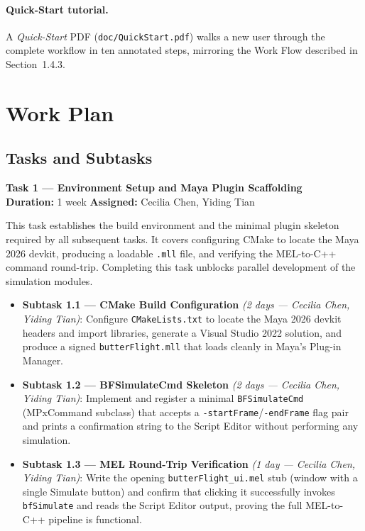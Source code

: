 \documentclass[12pt]{article}
\begin{document}
\paragraph{Quick-Start tutorial.}
A \textit{Quick-Start} PDF (\texttt{doc/QuickStart.pdf}) walks a new user through
the complete workflow in ten annotated steps, mirroring the Work Flow described in
Section~1.4.3.

\newpage

\section{Work Plan}

\subsection{Tasks and Subtasks}

\noindent\textbf{Task 1 --- Environment Setup and Maya Plugin Scaffolding}\\
\textbf{Duration:} 1 week \quad \textbf{Assigned:} Cecilia Chen, Yiding Tian

This task establishes the build environment and the minimal plugin skeleton required
by all subsequent tasks. It covers configuring CMake to locate the Maya 2026 devkit,
producing a loadable \texttt{.mll} file, and verifying the MEL-to-C++ command
round-trip. Completing this task unblocks parallel development of the simulation
modules.

\begin{itemize}
  \item \textbf{Subtask 1.1 --- CMake Build Configuration} \textit{(2 days --- Cecilia Chen, Yiding Tian)}: Configure
    \texttt{CMakeLists.txt} to locate the Maya 2026 devkit headers and import
    libraries, generate a Visual Studio 2022 solution, and produce a signed
    \texttt{butterFlight.mll} that loads cleanly in Maya's Plug-in Manager.
  \item \textbf{Subtask 1.2 --- BFSimulateCmd Skeleton} \textit{(2 days --- Cecilia Chen, Yiding Tian)}: Implement and register a
    minimal \texttt{BFSimulateCmd} (MPxCommand subclass) that accepts a
    \texttt{-startFrame}/\texttt{-endFrame} flag pair and prints a confirmation
    string to the Script Editor without performing any simulation.
  \item \textbf{Subtask 1.3 --- MEL Round-Trip Verification} \textit{(1 day --- Cecilia Chen, Yiding Tian)}: Write the opening
    \texttt{butterFlight\_ui.mel} stub (window with a single Simulate button) and
    confirm that clicking it successfully invokes \texttt{bfSimulate} and reads the
    Script Editor output, proving the full MEL-to-C++ pipeline is functional.
\end{itemize}
\end{document}
